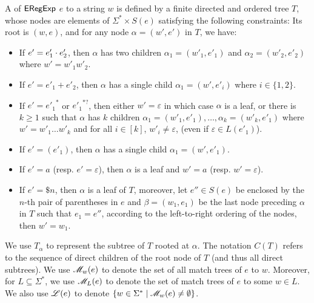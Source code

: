   \begin{definition}
  	A  of ${\sf ERegExp}$ $e$ to a string $w$ is defined by a finite directed and ordered
  	tree $T$, whose nodes are elements of $\Sigma^{\ast} \times S (e)$ satisfying the following constraints: Its root is $(w, e)$, and for any node $\alpha =
  	(w', e')$ in $T$, we have:
  	\begin{itemize}
  		\item If $e' = e'_1 \cdot e'_2$, then $\alpha$ has two children $\alpha_1 = (w'_1,
  		e'_1)$ and $\alpha_2=(w'_2, e'_2)$ where $w' = w'_1 w'_2$.
  		
  		\item If $e' = e'_1 + e'_2$, then $\alpha$ has a single child $\alpha_1 = (w',
  		e'_i)$ where $i \in \{ 1, 2 \}$.
  		
  		\item If $e' = {e'_1}^{\ast}$ or ${e'_1}^{\ast ?}$, then either $w' = \varepsilon$ in which case $\alpha$ is a
  		leaf, or there is $k \geqslant 1$ such that $\alpha$ has $k$ children $\alpha_1 = (w'_1,
  		e'_1), \ldots, \alpha_k = (w'_k, e'_1)$ where $w' = w'_1 \ldots w'_k$ and for all
  		$i \in [k]$, $w'_i \neq \varepsilon$, (even if $\varepsilon \in L
  		(e'_1)$).
%
%		
  		\item If $e' = (e'_1)$, then $\alpha$ has a single child $\alpha_1 = (w', e'_1)$.
  		\item If $e' = a$ (resp. $e' = \varepsilon$), then $\alpha$ is a leaf and
  		$w' = a$ (resp. $w' = \varepsilon$).
%		
		\item If $e' = \$n$, then $\alpha$ is a leaf of $T$, moreover, let $e'' \in S(e)$ be enclosed by the $n$-th pair of parentheses in $e$ and $\beta = (w_1, e_1)$ be the last node preceding $\alpha$ in $T$ such that $e_1 = e''$, according to the left-to-right ordering of the nodes, then $w' = w_1$.
  	\end{itemize}
  	
 We use $T_\alpha$ to represent the subtree of $T$ rooted at $\alpha$.
The notation $C(T)$ refers to the sequence of direct children of the root node of $T$ (and thus all direct subtrees).
%
We use $\mathscr{M}_{w}(e)$ to denote the set of all match trees of $e$ to $w$. Moreover, for $L \subseteq \Sigma^\ast$, we use $\mathscr{M}_{L}(e)$ to denote the set of match trees of $e$ to some $w \in L$.
We also use $\mathscr{L}(e)$ to denote $\{w \in \Sigma^* \mid \mathscr{M}_w(e) \neq \emptyset\}$. 
  \end{definition}
  
